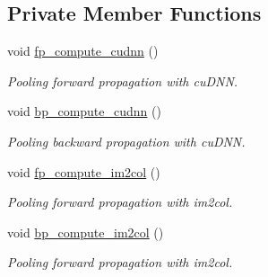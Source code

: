 \subsection*{Private Member Functions}
\begin{DoxyCompactItemize}
\item 
void \hyperlink{classlbann_1_1pooling__layer_a022eb4448992f654288b6b1ca95fcb6c}{fp\+\_\+compute\+\_\+cudnn} ()
\begin{DoxyCompactList}\small\item\em Pooling forward propagation with cu\+D\+NN. \end{DoxyCompactList}\item 
void \hyperlink{classlbann_1_1pooling__layer_a457b52475f27ab55985f1e47515e7c3b}{bp\+\_\+compute\+\_\+cudnn} ()
\begin{DoxyCompactList}\small\item\em Pooling backward propagation with cu\+D\+NN. \end{DoxyCompactList}\item 
void \hyperlink{classlbann_1_1pooling__layer_a76ce07a190fbe85685ea2ab4e53be7f9}{fp\+\_\+compute\+\_\+im2col} ()
\begin{DoxyCompactList}\small\item\em Pooling forward propagation with im2col. \end{DoxyCompactList}\item 
void \hyperlink{classlbann_1_1pooling__layer_a704aca0e1e5bba7d27b7755133e6d50b}{bp\+\_\+compute\+\_\+im2col} ()
\begin{DoxyCompactList}\small\item\em Pooling forward propagation with im2col. \end{DoxyCompactList}\end{DoxyCompactItemize}
